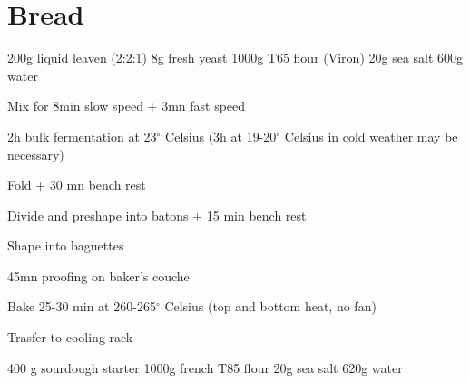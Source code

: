 \chapter{Bread}
\minitoc

\label{rec:bread-baguette}

\begin{ingreds}
	200g liquid leaven (2:2:1)
	8g fresh yeast
	1000g T65 flour (Viron)
	20g sea salt
	600g water

\end{ingreds}

\begin{method}		
 	Mix for 8min slow speed + 3mn fast speed
 	
 	2h bulk fermentation at 23$^{\circ}$ Celsius (3h at 19-20$^{\circ}$ Celsius in cold weather may be necessary)
 	
 	Fold + 30 mn bench rest
 	
 	Divide and preshape into batons + 15 min bench rest
 	
 	Shape into baguettes
 	
 	45mn proofing on baker's couche
 	
 	Bake 25-30 min at 260-265$^{\circ}$ Celsius (top and bottom heat, no fan)
 	
 	Trasfer to cooling rack

\end {method}

\label{rec:bread-campagne}

\begin{ingreds}
	400 g sourdough starter
	1000g french T85 flour
	20g sea salt
	620g water
\end{ingreds}

